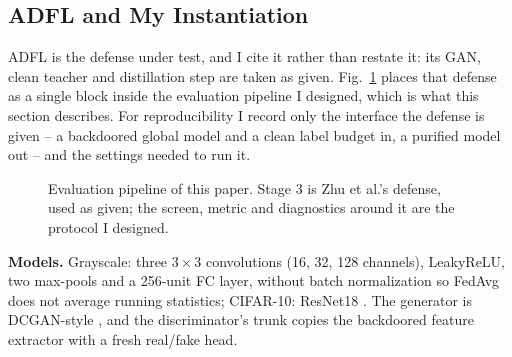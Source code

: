 \documentclass[conference]{IEEEtran}
\newcommand{\ASR}{\mathrm{ASR}}
\newcommand{\Texc}{\mathrm{T}}
\begin{document}
\subsection{ADFL and My Instantiation}
ADFL \cite{zhu2023adfl} is the defense under test, and I cite it rather than restate it: its GAN, clean teacher and distillation step are taken as given. Fig.~\ref{fig:pipe} places that defense as a single block inside the evaluation pipeline I designed, which is what this section describes. For reproducibility I record only the interface the defense is given -- a backdoored global model and a clean label budget in, a purified model out -- and the settings needed to run it.

\begin{figure}[t]
\centering
{}
\caption{Evaluation pipeline of this paper. Stage 3 is Zhu et al.'s defense, used as given; the screen, metric and diagnostics around it are the protocol I designed.}
\label{fig:pipe}
\end{figure}

\textbf{Models.} Grayscale: three $3{\times}3$ convolutions (16, 32, 128 channels), LeakyReLU, two max-pools and a 256-unit FC layer, without batch normalization \cite{ioffe2015bn} so FedAvg does not average running statistics; CIFAR-10: ResNet18 \cite{he2016resnet}. The generator is DCGAN-style \cite{radford2016dcgan}, and the discriminator's trunk copies the backdoored feature extractor with a fresh real/fake head.
\end{document}
